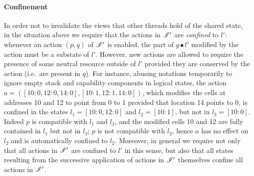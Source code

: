 \paragraph{\textbf{Confinement}}
In order not to invalidate the views that other threads hold of the
shared state, in the situation above we require that the actions in
$\mathscr{I}'$ are \emph{confined} to $l'$: whenever an action $(p,q)$ of
$\mathscr{I}'$ is enabled, the part of $g\bullet l'$ modified by the action
must be a substate of $l'$.  However, new actions are allowed to
require the presence of some neutral resource outside of $l'$ provided
they are conserved by the action (i.e.\ are present in $q$).
%
For instance, abusing notations temporarily to ignore empty stack and
capability components in logical states, the action $a = ([10:0, 12:0,
  14:0],[10:1, 12:1, 14:0])$, which modifies the cells at addresses 10
and 12 to point from 0 to 1 provided that location 14 points to 0, is
confined in the states $l_1=[10:0,12:0]$ and $l_2=[10:1]$, but not in
$l_3=[10:0]$. Indeed $p$ is compatible with $l_1$ and $l_3$, and the
modified cells 10 and 12 are fully contained in $l_1$ but not in
$l_3$; $p$ is not compatible with $l_2$, hence $a$ has no effect on
$l_2$ and is automatically confined to $l_2$.
%
Moreover, in general we require not only that all actions in $\mathscr{I}'$
are confined to $l'$ in this sense, but also that all states resulting
from the successive application of actions in $\mathscr{I}'$ themselves confine
all actions in $\mathscr{I}'$.

